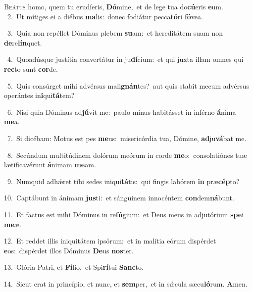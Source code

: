 \lettrine{\initial\textcolor{\initialcolor}{B}}{eátus} homo, quem tu erudíeris, \textbf{Dó}\-mine,~\star et de lege tua do\-\textbf{cú}\-eris \textbf{e}\-um.\\
{\numbfont\textcolor{\numbcolor}{~2.}}~Ut mítiges ei a diébus \textbf{ma}\-lis:~\star donec fodiátur pecca\-\textbf{tó}\-ri \textbf{fó}\-vea.\par
{\numbfont\textcolor{\numbcolor}{~3.}}~Quia non repéllet Dóminus plebem \textbf{su}\-am:~\star et hereditátem suam non \textbf{de}\-re\-\textbf{lín}\-quet.\par
{\numbfont\textcolor{\numbcolor}{~4.}}~Quoadúsque justítia convertátur in ju\-\textbf{dí}\-cium:~\star et qui juxta illam omnes qui \textbf{rec}\-to sunt \textbf{cor}\-de.\par
{\numbfont\textcolor{\numbcolor}{~5.}}~Quis consúrget mihi advérsus mali\-\textbf{gnán}\-tes?~\star aut quis stabit mecum advérsus operántes in\-\textbf{i}\-qui\-\textbf{tá}\-tem?\par
{\numbfont\textcolor{\numbcolor}{~6.}}~Nisi quia Dóminus ad\-\textbf{jú}\-vit me:~\star paulo minus habitásset in inférno \textbf{á}\-nima \textbf{me}\-a.\par
{\numbfont\textcolor{\numbcolor}{~7.}}~Si dicébam: Motus est pes \textbf{me}\-us:~\star misericórdia tua, Dómine, \textbf{ad}\-ju\-\textbf{vá}\-bat me.\par
{\numbfont\textcolor{\numbcolor}{~8.}}~Secúndum multitúdinem dolórum meórum in corde \textbf{me}\-o:~\star consolatiónes tuæ lætificavérunt \textbf{á}\-nimam \textbf{me}\-am.\par
{\numbfont\textcolor{\numbcolor}{~9.}}~Numquid adhǽret tibi sedes iniqui\-\textbf{tá}\-tis:~\star qui fingis labórem \textbf{in} præ\-\textbf{cép}\-to?\par
{\numbfont\textcolor{\numbcolor}{10.}}~Captábunt in ánimam \textbf{jus}\-ti:~\star et sánguinem innocéntem \textbf{con}\-dem\-\textbf{ná}\-bunt.\par
{\numbfont\textcolor{\numbcolor}{11.}}~Et factus est mihi Dóminus in re\-\textbf{fú}\-gium:~\star et Deus meus in adjutórium \textbf{spe}\-i \textbf{me}\-æ.\par
{\numbfont\textcolor{\numbcolor}{12.}}~Et reddet illis iniquitátem ipsórum:~\dagger et in malítia eórum dispérdet \textbf{e}\-os:~\star dispérdet illos Dóminus \textbf{De}\-us \textbf{nos}\-ter.\par
{\numbfont\textcolor{\numbcolor}{13.}}~Glória Patri, et \textbf{Fí}\-lio,~\star et Spi\-\textbf{rí}\-tui \textbf{Sanc}\-to.\par
{\numbfont\textcolor{\numbcolor}{14.}}~Sicut erat in princípio, et nunc, et \textbf{sem}\-per,~\star et in sǽcula sæcu\-\textbf{ló}\-rum. \textbf{A}\-men.\par
